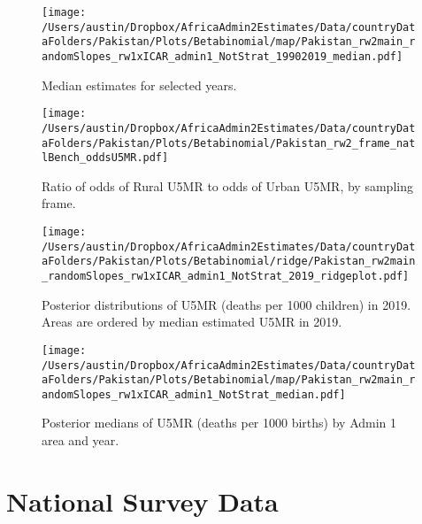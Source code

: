 \documentclass[]{article}
\begin{document}
\begin{figure}
\centering
\texttt{[image: /Users/austin/Dropbox/AfricaAdmin2Estimates/Data/countryDataFolders/Pakistan/Plots/Betabinomial/map/Pakistan\_rw2main\_randomSlopes\_rw1xICAR\_admin1\_NotStrat\_19902019\_median.pdf]}
\caption{Median estimates for selected years.}
\end{figure}
\clearpage

\begin{figure}
    \centering
    \texttt{[image: /Users/austin/Dropbox/AfricaAdmin2Estimates/Data/countryDataFolders/Pakistan/Plots/Betabinomial/Pakistan\_rw2\_frame\_natlBench\_oddsU5MR.pdf]}
    \caption{Ratio of odds of Rural U5MR to odds of Urban U5MR, by sampling frame.}
\end{figure}
\clearpage



\begin{figure}
\centering
\texttt{[image: /Users/austin/Dropbox/AfricaAdmin2Estimates/Data/countryDataFolders/Pakistan/Plots/Betabinomial/ridge/Pakistan\_rw2main\_randomSlopes\_rw1xICAR\_admin1\_NotStrat\_2019\_ridgeplot.pdf]}
\caption{Posterior distributions of U5MR (deaths per 1000 children) in 2019. Areas are ordered by median estimated U5MR in 2019.}
\end{figure}
\clearpage
\begin{figure}
\centering
\texttt{[image: /Users/austin/Dropbox/AfricaAdmin2Estimates/Data/countryDataFolders/Pakistan/Plots/Betabinomial/map/Pakistan\_rw2main\_randomSlopes\_rw1xICAR\_admin1\_NotStrat\_median.pdf]}
\caption{Posterior medians of U5MR (deaths per 1000 births) by Admin 1 area and year.}
\end{figure}
\clearpage

\hypertarget{national-survey-data}{%
\section{National Survey Data}\label{national-survey-data}}
\end{document}
